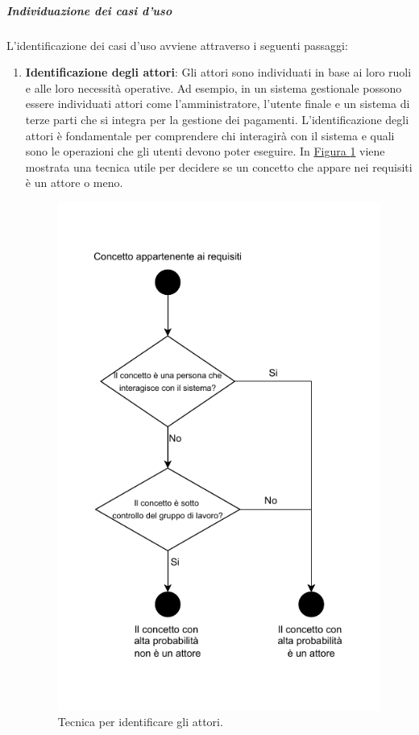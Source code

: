 \subparagraph{Individuazione dei casi d'uso}
L'identificazione dei casi d'uso avviene attraverso i seguenti passaggi:
\begin{enumerate}
    \item \textbf{Identificazione degli attori}: Gli attori sono individuati in base ai loro ruoli e alle loro necessità operative. 
    Ad esempio, in un sistema gestionale possono essere individuati attori come l'amministratore, l'utente finale e un sistema di terze parti che si integra per la gestione dei pagamenti.
    L'identificazione degli attori è fondamentale per comprendere chi interagirà con il sistema e quali sono le operazioni che gli utenti devono poter eseguire.
    In \hyperref[fig:identificare_attori]{Figura \ref{fig:identificare_attori}} viene mostrata una tecnica utile per decidere se un concetto che appare nei requisiti è un attore o meno.
    \begin{figure}[H]
        \centering
        \includegraphics{Sezioni/ProcessiPrimari/Immagini/tecnica_casi_uso.pdf}
        \caption{Tecnica per identificare gli attori.}
        \label{fig:identificare_attori}
    \end{figure} 


\end{enumerate}
